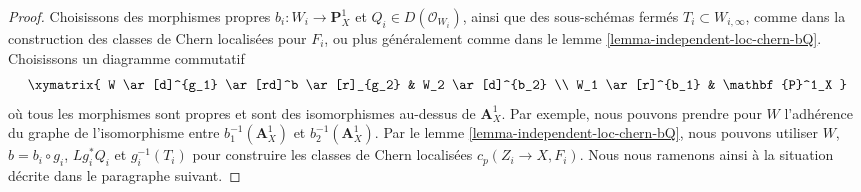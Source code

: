 \begin{proof}
Choisissons des morphismes propres $b_i : W_i \to \mathbf{P}^1_X$ et
$Q_i \in D(\mathcal{O}_{W_i})$, ainsi que des sous-schémas fermés
$T_i \subset W_{i, \infty}$, comme dans la construction des
classes de Chern localisées pour $F_i$, ou plus généralement comme dans le
lemme \ref{lemma-independent-loc-chern-bQ}. Choisissons un diagramme
commutatif
$$
\xymatrix{
W \ar[d]^{g_1} \ar[rd]^b \ar[r]_{g_2} & W_2 \ar[d]^{b_2} \\
W_1 \ar[r]^{b_1} & \mathbf{P}^1_X
}
$$
où tous les morphismes sont propres et sont des isomorphismes au-dessus de
$\mathbf{A}^1_X$. Par exemple, nous pouvons prendre pour $W$ l'adhérence
du graphe de l'isomorphisme entre
$b_1^{-1}(\mathbf{A}^1_X)$ et $b_2^{-1}(\mathbf{A}^1_X)$.
Par le lemme \ref{lemma-independent-loc-chern-bQ}, nous pouvons utiliser
$W$, $b = b_i \circ g_i$, $Lg_i^*Q_i$ et
$g_i^{-1}(T_i)$ pour construire les classes de Chern localisées
$c_p(Z_i \to X, F_i)$. Nous nous ramenons ainsi à la situation décrite
dans le paragraphe suivant.


\end{proof}
